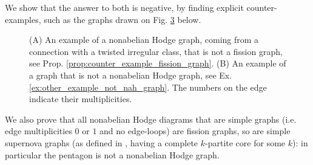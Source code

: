 \documentclass[11pt,a4paper]{amsart}
\numberwithin{equation}{section}
\begin{document}
We show that the answer to both is negative, by finding explicit counter-examples, such as the graphs drawn on Fig. \ref{fig:counter_examples_graphs_intro} below. 


\begin{figure}[H]
\centering
\begin{subfigure}[b]{0.45\textwidth}
\centering
{}
\caption{}
\label{subfig:counter_example_fission_graph_intro}
\end{subfigure}
\hfill
\begin{subfigure}[b]{0.45\textwidth}
\centering
{}
\caption{}
\label{subfig:counter_example_nah_graph_intro}
\end{subfigure}
\caption{(A) An example of a nonabelian Hodge graph, coming from a connection with a twisted irregular class, that is not a fission graph, see Prop. \ref{prop:counter_example_fission_graph}. (B) An example of a graph that is not a nonabelian Hodge graph, see Ex. \ref{ex:other_example_not_nah_graph}. The numbers on the edge indicate their multiplicities.}
\label{fig:counter_examples_graphs_intro}
\end{figure}

We also prove that all nonabelian Hodge diagrams that are simple graphs (i.e. edge multiplicities $0$ or $1$ and no edge-loops) are fission graphs, so are simple supernova graphs (as defined in \cite{boalch2008irregular, boalch2012simply}, having a complete $k$-partite core for some $k$): in particular the pentagon is not a nonabelian Hodge graph.
\end{document}
